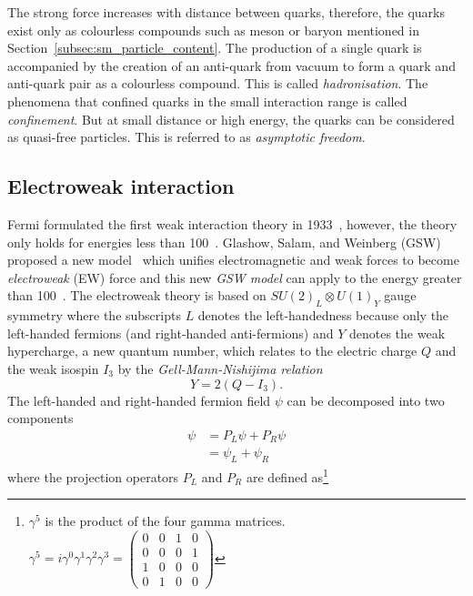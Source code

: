 The strong force increases with distance between quarks, therefore, the quarks exist only as colourless compounds such as meson or baryon mentioned in Section~\ref{subsec:sm_particle_content}.
The production of a single quark is accompanied by the creation of an anti-quark from vacuum to form a quark and anti-quark pair as a colourless compound.
This is called \textit{hadronisation}.
The phenomena that confined quarks in the small interaction range is called \textit{confinement}.
But at small distance or high energy, the quarks can be considered as quasi-free particles.
This is referred to as \textit{asymptotic freedom}.


\subsection{Electroweak interaction}
\label{subsec:sm_ewk_interaction}
Fermi formulated the first weak interaction theory in 1933~\cite{Fermi:1934hr}, however, the theory only holds for energies less than 100~{\GeV}.
Glashow, Salam, and Weinberg (GSW) proposed a new model~\cite{Salam:1968rm, Weinberg:1967tq, Glashow:1961tr} which unifies electromagnetic and weak forces to become \textit{electroweak} (EW) force and this new \textit{GSW model} can apply to the energy greater than 100~{\GeV}.
The electroweak theory is based on $SU(2)_{L} \otimes U(1)_{Y}$ gauge symmetry where the subscripts $L$ denotes the left-handedness because only the left-handed fermions (and right-handed anti-fermions) and $Y$ denotes the weak hypercharge, a new quantum number, which relates to the electric charge $Q$ and the weak isospin $I_{3}$ by the \textit{Gell-Mann-Nishijima relation}~\cite{Nakano:1953zz, Gell-Mann:1956iqa}
%
\begin{equation}
    Y = 2(Q - I_{3}).
    \label{eq:sm_hypercharge}
\end{equation}
%
The left-handed and right-handed fermion field $\psi$ can be decomposed into two components
%
\begin{align}
    \psi & = P_{L}\psi + P_{R}\psi\\
         & = \psi_{L} + \psi_{R}
    \label{eq:sm_fermion_field_components}
\end{align}
%
where the projection operators $P_{L}$ and $P_{R}$ are defined as\footnote{$\gamma^{5}$ is the product of the four gamma matrices. $\gamma^{5} = i \gamma^{0} \gamma^{1} \gamma^{2} \gamma^{3} = \left(\begin{matrix}0 & 0 & 1 & 0\\0 & 0 & 0 & 1\\1 & 0 & 0 & 0\\0 & 1 & 0 & 0\end{matrix}\right)$}
